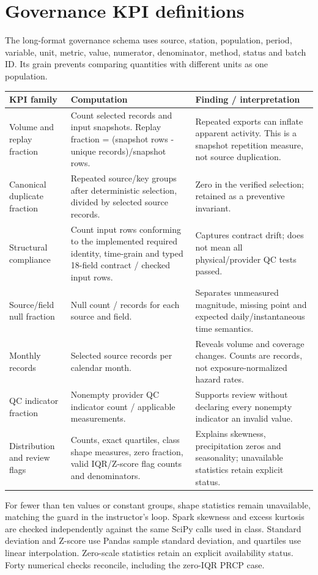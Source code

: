 \documentclass[10pt]{article}
\begin{document}
\section{Governance KPI definitions}
The long-format governance schema uses source, station, population, period,
variable, unit, metric, value, numerator, denominator, method, status and batch ID.
Its grain prevents comparing quantities with different units as one population.
\begin{longtable}{L{4.2cm}L{7.0cm}L{5.6cm}}
\toprule KPI family & Computation & Finding / interpretation\\\midrule
Volume and replay fraction & Count selected records and input snapshots. Replay fraction = (snapshot rows - unique records)/snapshot rows. & Repeated exports can inflate apparent activity. This is a snapshot repetition measure, not source duplication.\\
Canonical duplicate fraction & Repeated source/key groups after deterministic selection, divided by selected source records. & Zero in the verified selection; retained as a preventive invariant.\\
Structural compliance & Count input rows conforming to the implemented required identity, time-grain and typed 18-field contract / checked input rows. & Captures contract drift; does not mean all physical/provider QC tests passed.\\
Source/field null fraction & Null count / records for each source and field. & Separates unmeasured magnitude, missing point and expected daily/instantaneous time semantics.\\
Monthly records & Selected source records per calendar month. & Reveals volume and coverage changes. Counts are records, not exposure-normalized hazard rates.\\
QC indicator fraction & Nonempty provider QC indicator count / applicable measurements. & Supports review without declaring every nonempty indicator an invalid value.\\
Distribution and review flags & Counts, exact quartiles, class shape measures, zero fraction, valid IQR/Z-score flag counts and denominators. & Explains skewness, precipitation zeros and seasonality; unavailable statistics retain explicit status.\\
\bottomrule
\end{longtable}
For fewer than ten values or constant groups, shape statistics remain unavailable,
matching the guard in the instructor's loop. Spark skewness and excess kurtosis
are checked independently against the same SciPy calls used in class. Standard
deviation and Z-score use Pandas sample standard deviation, and quartiles use
linear interpolation. Zero-scale statistics retain an explicit availability
status. Forty numerical checks reconcile, including the zero-IQR PRCP case.
\end{document}
